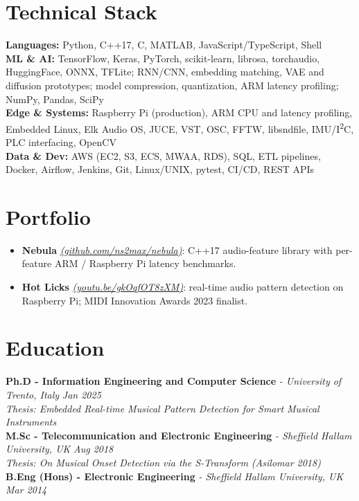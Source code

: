 \documentclass[11pt]{article}
\begin{document}
\section*{Technical Stack}

\textbf{Languages:} Python, C++17, C, MATLAB, JavaScript/TypeScript, Shell\\
\textbf{ML \& AI:} TensorFlow, Keras, PyTorch, scikit-learn, librosa, torchaudio, HuggingFace, ONNX, TFLite; RNN/CNN, embedding matching, VAE and diffusion prototypes; model compression, quantization, ARM latency profiling; NumPy, Pandas, SciPy\\
\textbf{Edge \& Systems:} Raspberry Pi (production), ARM CPU and latency profiling, Embedded Linux, Elk Audio OS, JUCE, VST, OSC, FFTW, libsndfile, IMU/I\textsuperscript{2}C, PLC interfacing, OpenCV\\
\textbf{Data \& Dev:} AWS (EC2, S3, ECS, MWAA, RDS), SQL, ETL pipelines, Docker, Airflow, Jenkins, Git, Linux/UNIX, pytest, CI/CD, REST APIs

\section*{Portfolio \footnotesize {}}
\begin{itemize}[leftmargin=1.2em, itemsep=-0.25em]
    \item \textbf{Nebula} \href{https://github.com/ns2max/nebula}{\textit{(github.com/ns2max/nebula)}}: C++17 audio-feature library with per-feature ARM / Raspberry Pi latency benchmarks.
    \item \textbf{Hot Licks} \href{https://youtu.be/gkOqfOT8zXM}{\textit{(youtu.be/gkOqfOT8zXM)}}: real-time audio pattern detection on Raspberry Pi; MIDI Innovation Awards 2023 finalist.
\end{itemize}

\section*{Education}
\textbf{Ph.D - Information Engineering and Computer Science} \textit{\small{ - University of Trento, Italy}} \hfill \textit{Jan 2025}\\[2pt]
\noindent\textit{\small Thesis: Embedded Real-time Musical Pattern Detection for Smart Musical Instruments}\\[3pt]
\noindent\textbf{M.Sc - Telecommunication and Electronic Engineering} \textit{\small{ - Sheffield Hallam University, UK}} \hfill \textit{Aug 2018}\\[2pt]
\noindent\textit{\small Thesis: On Musical Onset Detection via the S-Transform (Asilomar 2018)}\\[3pt]
\noindent\textbf{B.Eng (Hons) - Electronic Engineering} \textit{\small{ - Sheffield Hallam University, UK}} \hfill \textit{Mar 2014}
\end{document}
